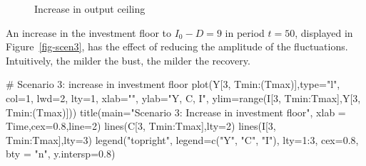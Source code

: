 \documentclass[
  letterpaper,
  DIV=11,
  numbers=noendperiod]{scrreprt}
\newenvironment{Shaded}{\begin{snugshade}}{\end{snugshade}}
\newcommand{\AttributeTok}[1]{\textcolor[rgb]{0.40,0.45,0.13}{#1}}
\newcommand{\CommentTok}[1]{\textcolor[rgb]{0.37,0.37,0.37}{#1}}
\newcommand{\DecValTok}[1]{\textcolor[rgb]{0.68,0.00,0.00}{#1}}
\newcommand{\FloatTok}[1]{\textcolor[rgb]{0.68,0.00,0.00}{#1}}
\newcommand{\FunctionTok}[1]{\textcolor[rgb]{0.28,0.35,0.67}{#1}}
\newcommand{\NormalTok}[1]{\textcolor[rgb]{0.00,0.23,0.31}{#1}}
\newcommand{\SpecialCharTok}[1]{\textcolor[rgb]{0.37,0.37,0.37}{#1}}
\newcommand{\StringTok}[1]{\textcolor[rgb]{0.13,0.47,0.30}{#1}}
\begin{document}
\begin{figure}[H]


\caption{\label{fig-scen2}Increase in output ceiling}

\end{figure}%

An increase in the investment floor to \(I_0 - D = 9\) in period
\(t=50\), displayed in Figure~\ref{fig-scen3}, has the effect of
reducing the amplitude of the fluctuations. Intuitively, the milder the
bust, the milder the recovery.

\begin{Shaded}
\begin{Highlighting}[]
\CommentTok{\# Scenario 3: increase in investment floor}
\FunctionTok{plot}\NormalTok{(Y[}\DecValTok{3}\NormalTok{, Tmin}\SpecialCharTok{:}\NormalTok{(Tmax)],}\AttributeTok{type=}\StringTok{"l"}\NormalTok{, }\AttributeTok{col=}\DecValTok{1}\NormalTok{, }\AttributeTok{lwd=}\DecValTok{2}\NormalTok{, }\AttributeTok{lty=}\DecValTok{1}\NormalTok{, }\AttributeTok{xlab=}\StringTok{""}\NormalTok{, }\AttributeTok{ylab=}\StringTok{"Y, C, I"}\NormalTok{, }\AttributeTok{ylim=}\FunctionTok{range}\NormalTok{(I[}\DecValTok{3}\NormalTok{, Tmin}\SpecialCharTok{:}\NormalTok{Tmax],Y[}\DecValTok{3}\NormalTok{, Tmin}\SpecialCharTok{:}\NormalTok{(Tmax)]))}
\FunctionTok{title}\NormalTok{(}\AttributeTok{main=}\StringTok{"Scenario 3: Increase in investment floor"}\NormalTok{, }\AttributeTok{xlab =} \StringTok{\textquotesingle{}Time\textquotesingle{}}\NormalTok{,}\AttributeTok{cex=}\FloatTok{0.8}\NormalTok{,}\AttributeTok{line=}\DecValTok{2}\NormalTok{)}
\FunctionTok{lines}\NormalTok{(C[}\DecValTok{3}\NormalTok{, Tmin}\SpecialCharTok{:}\NormalTok{Tmax],}\AttributeTok{lty=}\DecValTok{2}\NormalTok{)}
\FunctionTok{lines}\NormalTok{(I[}\DecValTok{3}\NormalTok{, Tmin}\SpecialCharTok{:}\NormalTok{Tmax],}\AttributeTok{lty=}\DecValTok{3}\NormalTok{)}
\FunctionTok{legend}\NormalTok{(}\StringTok{"topright"}\NormalTok{, }\AttributeTok{legend=}\FunctionTok{c}\NormalTok{(}\StringTok{"Y"}\NormalTok{, }\StringTok{"C"}\NormalTok{, }\StringTok{"I"}\NormalTok{),}
       \AttributeTok{lty=}\DecValTok{1}\SpecialCharTok{:}\DecValTok{3}\NormalTok{, }\AttributeTok{cex=}\FloatTok{0.8}\NormalTok{, }\AttributeTok{bty =} \StringTok{"n"}\NormalTok{, }\AttributeTok{y.intersp=}\FloatTok{0.8}\NormalTok{)}
\end{Highlighting}
\end{Shaded}
\end{document}
